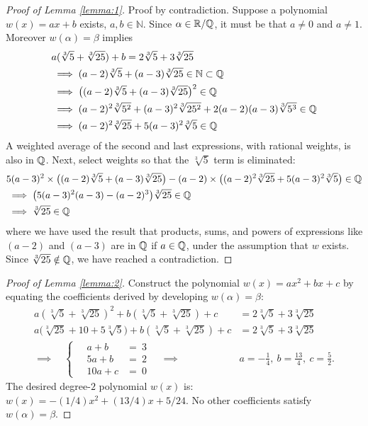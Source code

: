 \begin{proof}[Proof of Lemma \ref{lemma:1}]
Proof by contradiction. Suppose a polynomial $w(x)=ax+b$ exists, $a,b\in\mathbb{N}$. Since $\alpha\in\mathbb{R}/\mathbb{Q}$, it must be that $a\ne0$ and $a\ne1$. Moreover $w(\alpha)=\beta$ implies
\begin{align*}
&
a (\sqrt[3]{5}+\sqrt[3]{25}) + b
= 2\sqrt[3]{5}+3\sqrt[3]{25}
\\
& \implies
(a-2)\sqrt[3]{5} + (a-3)\sqrt[3]{25} 
\in \mathbb{N} \subset \mathbb{Q}
\\
& \implies
\bigl((a-2)\sqrt[3]{5} + (a-3)\sqrt[3]{25}\bigr)^{2}
\in \mathbb{Q}
\\
& \implies
(a-2)^{2}\sqrt[3]{5^{2}} + (a-3)^{2}\sqrt[3]{25^{2}} + 2(a-2)(a-3)\sqrt[3]{5^{3}} 
\in \mathbb{Q}
\\
& \implies
(a-2)^{2}\sqrt[3]{25} + 5(a-3)^{2}\sqrt[3]{5} 
\in \mathbb{Q}
\end{align*}
A weighted average of the second and last expressions, with rational weights, is also in $\mathbb{Q}$. Next, select weights so that the $\sqrt[3]{5}$ term is eliminated:
\begin{align*}
&
5(a-3)^{2} \times 
\bigl((a-2)\sqrt[3]{5} + (a-3)\sqrt[3]{25}\bigr)
-
(a-2) \times
\bigl((a-2)^{2}\sqrt[3]{25} + 5(a-3)^{2}\sqrt[3]{5}\bigr)
\in \mathbb{Q}
\\
& \implies
\bigl(5(a-3)^{2}(a-3) - (a-2)^{3}\bigr)\sqrt[3]{25}
\in \mathbb{Q}
\\
& \implies
\sqrt[3]{25}
\in \mathbb{Q}
\end{align*}
where we have used the result that products, sums, and powers of expressions like $(a-2)$ and $(a-3)$ are in $\mathbb{Q}$ if $a\in\mathbb{Q}$, under the assumption that $w$ exists. Since $\sqrt[3]{25}\notin\mathbb{Q}$, we have reached a contradiction.
\end{proof}

\begin{proof}[Proof of Lemma \ref{lemma:2}]
Construct the polynomial $w(x)=ax^{2}+bx+c$ by equating the coefficients derived by developing $w(\alpha)=\beta$:
\begin{align*}
a (\sqrt[3]{5}+\sqrt[3]{25})^{2} + b (\sqrt[3]{5}+\sqrt[3]{25}) + c
& = 2\sqrt[3]{5} + 3\sqrt[3]{25}
\\[1ex]
a \bigl(\sqrt[3]{25} + 10 + 5\sqrt[3]{5}\bigr)
+ b (\sqrt[3]{5}+\sqrt[3]{25}) + c
& = 2\sqrt[3]{5} + 3\sqrt[3]{25}
\\
\implies \quad
{\scriptscriptstyle
\begin{cases}
\quad
a + b
& = \ 3
\\\quad
5a + b
& = \ 2
\\\quad
10a + c
& = \ 0
\end{cases}}
\quad \implies \quad & 
a = -\frac{1}{4}, \
b = \frac{13}{4}, \
c = \frac{5}{2}.
\end{align*}
The desired degree-$2$ polynomial $w(x)$ is: $w(x)=-(1/4)x^{2}+(13/4)x+5/24$. No other coefficients satisfy $w(\alpha)=\beta$.
\end{proof}

